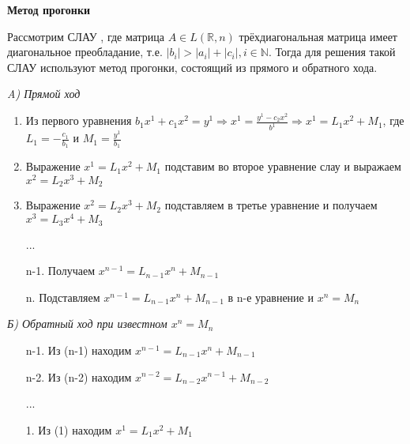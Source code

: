 \documentclass[__main__.tex]{subfiles}
\begin{document}
\textbf{Метод прогонки}

Рассмотрим СЛАУ , где матрица $A \in L(\mathbb{R},n)$ трёхдиагональная матрица имеет диагональное преобладание, т.е. $|b_i| >|a_i| + |c_i|, i \in \mathbb{N}$. Тогда для решения такой СЛАУ используют метод прогонки, состоящий из прямого и обратного хода.

\textit{A) Прямой ход}
\begin{enumerate}
    \item
          Из первого уравнения $b_1 x^1 + c_1 x^2 =y^1 \Rightarrow x^1 = \frac{y^1 - c_2 x^2}{b^1} \Rightarrow x^1 = L_1 x^2 + M_1$, где $L_1 = - \frac{c_1}{b_1}$ и $M_1 = \frac{y^1}{b_1}$

    \item
          Выражение $x^1 = L_1 x^2 + M_1$ подставим во второе уравнение слау и выражаем $x^2 = L_2 x^3 + M_2$

    \item
          Выражение $x^2 = L_2 x^3 + M_2$ подставляем в третье уравнение и получаем $x^3 = L_3 x^4 + M_3$

          ...

    \item[n-1.]
          Получаем $x^{n-1} = L_{n-1} x^n + M_{n-1}$

    \item[n.]
          Подставляем $x^{n-1} = L_{n-1} x^n + M_{n-1}$ в n-е уравнение и $x^n = M_n$
\end{enumerate}

\textit{Б) Обратный ход при известном $x^n = M_n$}
\begin{enumerate}
    \item[n-1.]
          Из (n-1) находим $x^{n-1} = L_{n-1} x^n + M_{n-1}$

    \item[n-2.]
          Из (n-2) находим $x^{n-2} = L_{n-2} x^{n-1} + M_{n-2}$

          ...

    \item[1.]
          Из (1) находим $x^{1} = L_{1} x^{2} + M_{1}$
\end{enumerate}
\end{document}
